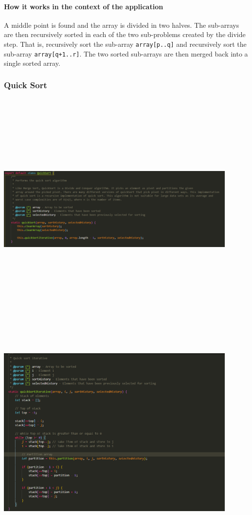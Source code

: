 \paragraph{How it works in the context of the application}
A middle point is found and the array is divided in two halves. The sub-arrays are then recursively sorted in each of the two sub-problems created by the divide step. That is, recursively sort the sub-array \lstinline{array[p..q]} and recursively sort the sub-array \lstinline{array[q+1..r]}. The two sorted sub-arrays are then merged back into a single sorted array.

\subsubsection{Quick Sort}
\begin{center}
    \includegraphics[width=12cm,height=12cm,keepaspectratio]{images/quicksort1}
    \includegraphics[width=12cm,height=12cm,keepaspectratio]{images/quicksort3}

\end{center}

